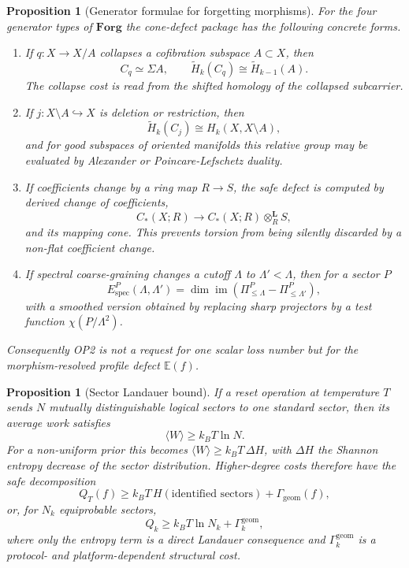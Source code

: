 \documentclass[11pt,a4paper]{article}
\newtheorem{proposition}[theorem]{Proposition}
\theoremstyle{definition}
\theoremstyle{remark}
\newcommand{\Forg}{\mathbf{Forg}}
\begin{document}
\begin{proposition}[Generator formulae for forgetting morphisms]
\label{prop:forg-generators}
For the four generator types of $\Forg$ the cone-defect package has the following concrete
forms.
\begin{enumerate}[label=(\roman*)]
\item If $q:X\to X/A$ collapses a cofibration subspace $A\subset X$, then
\[
C_q\simeq \Sigma A,
\qquad
\widetilde H_k(C_q)\cong \widetilde H_{k-1}(A).
\]
The collapse cost is read from the shifted homology of the collapsed subcarrier.
\item If $j:X\setminus A\hookrightarrow X$ is deletion or restriction, then
\[
\widetilde H_k(C_j)\cong H_k(X,X\setminus A),
\]
and for good subspaces of oriented manifolds this relative group may be evaluated by Alexander
or Poincare-Lefschetz duality.
\item If coefficients change by a ring map $R\to S$, the safe defect is computed by derived change
of coefficients,
\[
C_*(X;R)\longrightarrow C_*(X;R)\otimes_R^{\mathbf L}S,
\]
and its mapping cone.  This prevents torsion from being silently discarded by a non-flat
coefficient change.
\item If spectral coarse-graining changes a cutoff $\Lambda$ to $\Lambda'<\Lambda$, then for a
sector $P$
\[
E^{P}_{\mathrm{spec}}(\Lambda,\Lambda')
=\dim\operatorname{im}(\Pi^{P}_{\le\Lambda}-\Pi^{P}_{\le\Lambda'}),
\]
with a smoothed version obtained by replacing sharp projectors by a test function
$\chi(P/\Lambda^2)$.
\end{enumerate}
Consequently OP2 is not a request for one scalar loss number but for the morphism-resolved
profile defect $\mathbb E(f)$.
\end{proposition}

\begin{proposition}[Sector Landauer bound]
\label{prop:sector-landauer}
If a reset operation at temperature $T$ sends $N$ mutually distinguishable logical sectors to
one standard sector, then its average work satisfies
\[
\langle W\rangle\ge k_B T\ln N.
\]
For a non-uniform prior this becomes $\langle W\rangle\ge k_BT\,\Delta H$, with $\Delta H$ the
Shannon entropy decrease of the sector distribution.  Higher-degree costs therefore have the
safe decomposition
\[
Q_T(f)\ge k_BT\,H(\text{identified sectors})+\Gamma_{\mathrm{geom}}(f),
\]
or, for $N_k$ equiprobable sectors,
\[
Q_k\ge k_BT\ln N_k+\Gamma_k^{\mathrm{geom}},
\]
where only the entropy term is a direct Landauer consequence and $\Gamma_k^{\mathrm{geom}}$ is
a protocol- and platform-dependent structural cost.
\end{proposition}
\end{document}
